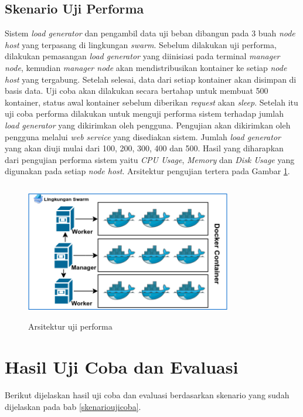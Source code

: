 	\subsection{Skenario Uji Performa} \label{skenujiperforma}
		Sistem \textit{load generator} dan pengambil data uji beban dibangun pada 3 buah \textit{node host} yang terpasang di lingkungan \textit{swarm}.  Sebelum dilakukan uji performa, dilakukan pemasangan \textit{load generator} yang diinisiasi pada terminal \textit{manager node}, kemudian \textit{manager node} akan mendistribusikan kontainer ke setiap \textit{node host} yang tergabung. Setelah selesai, data dari setiap kontainer akan disimpan di basis data. Uji coba akan dilakukan secara bertahap untuk membuat 500 kontainer, status awal kontainer sebelum diberikan \textit{request} akan \textit{sleep}. Setelah itu uji coba performa dilakukan untuk menguji performa sistem terhadap jumlah \textit{load generator} yang dikirimkan oleh pengguna. Pengujian akan dikirimkan oleh pengguna melalui \textit{web service} yang disediakan sistem. Jumlah \textit{load generator} yang akan diuji mulai dari 100, 200, 300, 400 dan 500. Hasil yang diharapkan dari pengujian performa sistem yaitu \textit{CPU Usage}, \textit{Memory} dan \textit{Disk Usage} yang digunakan pada setiap \textit{node host}. Arsitektur pengujian tertera pada Gambar \ref{ujiperforma}.
		\begin{figure}[H]
			\centering
			\includegraphics[width=9cm,height=6cm]{Images/C-5/performa.png}
			\caption{Arsitektur uji performa}
			\label{ujiperforma}
		\end{figure}
	
	\section{Hasil Uji Coba dan Evaluasi}
		Berikut dijelaskan hasil uji coba dan evaluasi berdasarkan skenario yang sudah dijelaskan pada bab \ref{skenarioujicoba}.
		
